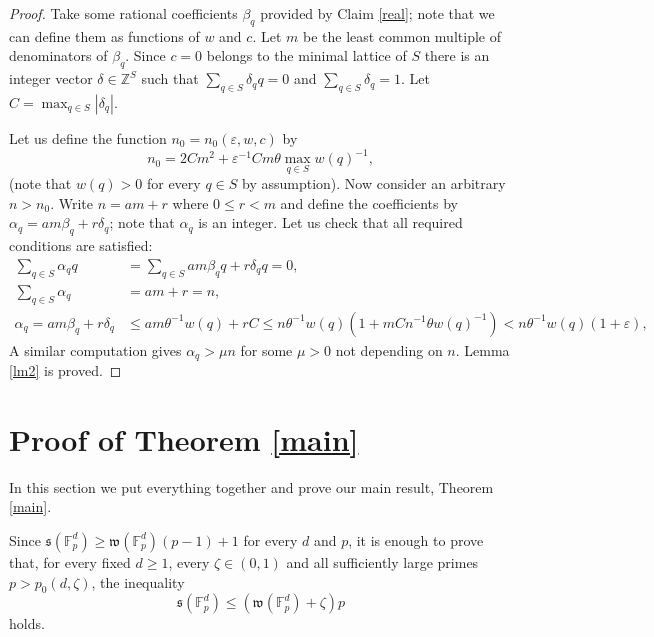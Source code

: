 \documentclass{daj}
\renewcommand{\le}{\leqslant}
\renewcommand{\ge}{\geqslant}
\newcommand{\s}{\mathfrak s}
\newcommand{\w}{\mathfrak w}
\newcommand{\Z}{\mathbb Z}
\newcommand{\FF}{\mathbb F}
\theoremstyle{definition}
\theoremstyle{remark}
\theoremstyle{definition}
\theoremstyle{definition}
\begin{document}
\begin{proof}
Take some rational coefficients $\beta_q$ provided by Claim \ref{real}; note that we can define them as functions of $w$ and $c$. Let $m$ be the least common multiple of denominators of $\beta_q$.
Since $c=0$ belongs to the minimal lattice of $S$ there is an integer vector $\delta \in \Z^S$ such that $\sum_{q \in S} \delta_q q = 0$ and $\sum_{q \in S} \delta_q = 1$. Let $C = \max_{q \in S} |\delta_q|$. 

Let us define the function $n_0 = n_0(\varepsilon, w, c)$ by
$$
n_0 = 2Cm^2 + \varepsilon^{-1} Cm\theta \max_{q\in S} w(q)^{-1}, 
$$
(note that $w(q) > 0$ for every $q \in S$ by assumption). Now consider an arbitrary $n > n_0$. Write $n = am+r$ where $0 \le r < m$ and define the coefficients by $\alpha_q = a m \beta_q + r \delta_q$; note that $\alpha_q$ is an integer.
Let us check that all required conditions are satisfied:
\begin{align*}
    \sum_{q \in S} \alpha_q q &= \sum_{q \in S} am\beta_q q + r \delta_q q = 0, \\
    \sum_{q \in S} \alpha_q &= am+r = n, \\
    \alpha_q = am\beta_q + r \delta_q &\le am \theta^{-1} w(q) + rC \le n \theta^{-1} w(q) (1 + mC n^{-1} \theta w(q)^{-1}) < n\theta^{-1} w(q) (1 + \varepsilon),
\end{align*}
A similar computation gives $\alpha_q > \mu n$ for some $\mu > 0$ not depending on $n$. Lemma \ref{lm2} is proved.
\end{proof}


\section{Proof of Theorem \ref{main}}\label{s5}

In this section we put everything together and prove our main result, Theorem \ref{main}. 

Since $\s(\FF_p^d) \ge \w(\FF_p^d)(p-1)+1$ for every $d$ and $p$, it is enough to prove that, for every fixed $d \ge 1$, every $\zeta \in (0,1)$ and all sufficiently large primes $p > p_0(d, \zeta)$, the inequality 
$$
\s(\FF_p^d) \le (\w(\FF_p^d)+\zeta)p
$$
holds.
\end{document}
